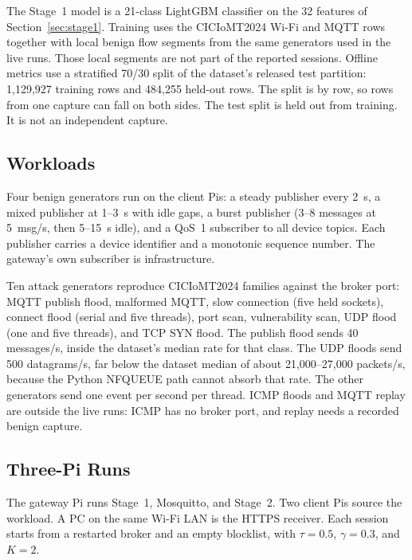 \documentclass[journal]{IEEEtran}
\begin{document}
The Stage~1 model is a 21-class LightGBM classifier on the 32 features of Section~\ref{sec:stage1}. Training uses the CICIoMT2024 Wi-Fi and MQTT rows together with local benign flow segments from the same generators used in the live runs. Those local segments are not part of the reported sessions. Offline metrics use a stratified 70/30 split of the dataset's released test partition: 1,129,927 training rows and 484,255 held-out rows. The split is by row, so rows from one capture can fall on both sides. The test split is held out from training. It is not an independent capture.

\subsection{Workloads}

Four benign generators run on the client Pis: a steady publisher every 2~s, a mixed publisher at 1--3~s with idle gaps, a burst publisher (3--8 messages at 5~msg/s, then 5--15~s idle), and a QoS~1 subscriber to all device topics. Each publisher carries a device identifier and a monotonic sequence number. The gateway's own subscriber is infrastructure.

Ten attack generators reproduce CICIoMT2024 families against the broker port: MQTT publish flood, malformed MQTT, slow connection (five held sockets), connect flood (serial and five threads), port scan, vulnerability scan, UDP flood (one and five threads), and TCP SYN flood. The publish flood sends 40 messages/s, inside the dataset's median rate for that class. The UDP floods send 500 datagrams/s, far below the dataset median of about 21,000--27,000 packets/s, because the Python NFQUEUE path cannot absorb that rate. The other generators send one event per second per thread. ICMP floods and MQTT replay are outside the live runs: ICMP has no broker port, and replay needs a recorded benign capture.

\subsection{Three-Pi Runs}
\label{sec:protocol}

The gateway Pi runs Stage~1, Mosquitto, and Stage~2. Two client Pis source the workload. A PC on the same Wi-Fi LAN is the HTTPS receiver. Each session starts from a restarted broker and an empty blocklist, with $\tau = 0.5$, $\gamma = 0.3$, and $K = 2$.
\end{document}
